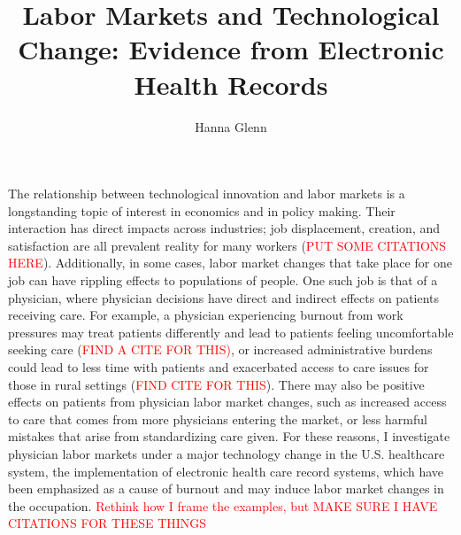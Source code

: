 \documentclass[11pt]{article}
\title{Labor Markets and Technological Change: Evidence from Electronic Health Records}
\author{Hanna Glenn}
\begin{document}
\maketitle



\vspace{1.5cm}

The relationship between technological innovation and labor markets is a longstanding topic of interest in economics and in policy making. Their interaction has direct impacts across industries; job displacement, creation, and satisfaction are all prevalent reality for many workers (\textcolor{red}{PUT SOME CITATIONS HERE}). Additionally, in some cases, labor market changes that take place for one job can have rippling effects to populations of people. One such job is that of a physician, where physician decisions have direct and indirect effects on patients receiving care. For example, a physician experiencing burnout from work pressures may treat patients differently and lead to patients feeling uncomfortable seeking care (\textcolor{red}{FIND A CITE FOR THIS)}, or increased administrative burdens could lead to less time with patients and exacerbated access to care issues for those in rural settings (\textcolor{red}{FIND CITE FOR THIS}). There may also be positive effects on patients from physician labor market changes, such as increased access to care that comes from more physicians entering the market, or less harmful mistakes that arise from standardizing care given. For these reasons, I investigate physician labor markets under a major technology change in the U.S. healthcare system, the implementation of electronic health care record systems, which have been emphasized as a cause of burnout and may induce labor market changes in the occupation. \textcolor{red}{Rethink how I frame the examples, but MAKE SURE I HAVE CITATIONS FOR THESE THINGS}
\end{document}

